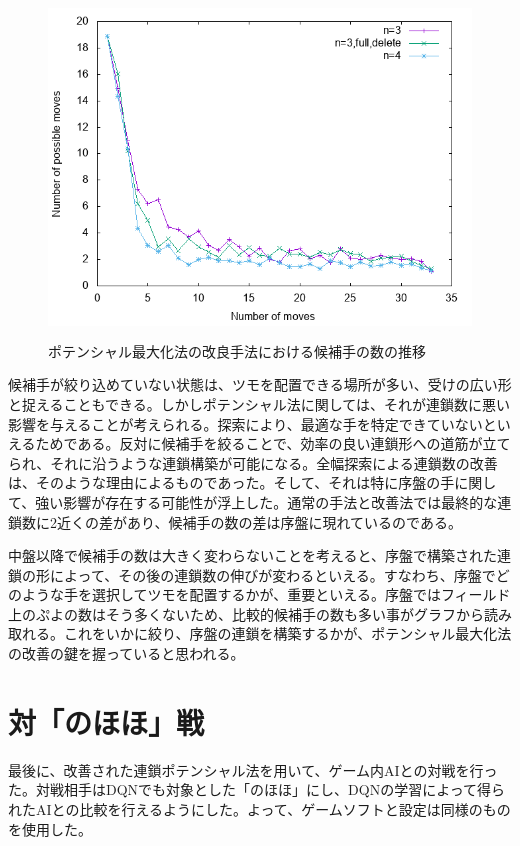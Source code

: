 \documentclass[12pt]{jarticle}
\begin{document}
\begin{figure}[hbt]
  \begin{center}
  \includegraphics[height=9cm]{experiment/Potential/KAI/graph/tsumoList_D3_fulldel_D4.png}
  \caption{ポテンシャル最大化法の改良手法における候補手の数の推移} \label{fig:poten_tsumoList}
\end{center}
\end{figure}

候補手が絞り込めていない状態は、ツモを配置できる場所が多い、受けの広い形と捉えることもできる。しかしポテンシャル法に関しては、それが連鎖数に悪い影響を与えることが考えられる。探索により、最適な手を特定できていないといえるためである。反対に候補手を絞ることで、効率の良い連鎖形への道筋が立てられ、それに沿うような連鎖構築が可能になる。全幅探索による連鎖数の改善は、そのような理由によるものであった。そして、それは特に序盤の手に関して、強い影響が存在する可能性が浮上した。通常の手法と改善法では最終的な連鎖数に2近くの差があり、候補手の数の差は序盤に現れているのである。

中盤以降で候補手の数は大きく変わらないことを考えると、序盤で構築された連鎖の形によって、その後の連鎖数の伸びが変わるといえる。すなわち、序盤でどのような手を選択してツモを配置するかが、重要といえる。序盤ではフィールド上のぷよの数はそう多くないため、比較的候補手の数も多い事がグラフから読み取れる。これをいかに絞り、序盤の連鎖を構築するかが、ポテンシャル最大化法の改善の鍵を握っていると思われる。


\section{対「のほほ」戦}
最後に、改善された連鎖ポテンシャル法を用いて、ゲーム内AIとの対戦を行った。対戦相手はDQNでも対象とした「のほほ」にし、DQNの学習によって得られたAIとの比較を行えるようにした。よって、ゲームソフトと設定は同様のものを使用した。
\end{document}
